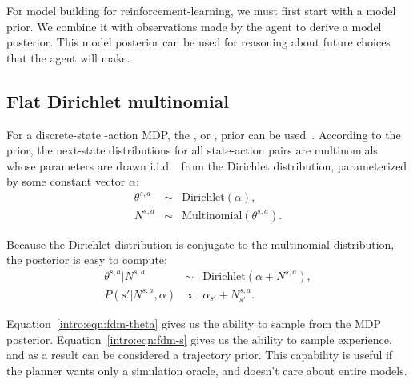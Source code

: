 For model building for reinforcement-learning, we must first start with a model prior. We combine it with observations made by the agent to derive a model posterior. This model posterior can be used for reasoning about future choices that the agent will make.

\subsection{Flat Dirichlet multinomial}

\label{intro:fdm}

For a discrete-state -action MDP, the , or , prior can be used~\cite{poupart06}. According to the  prior, the next-state distributions for all state-action pairs are multinomials whose parameters are drawn i.i.d. \ from the Dirichlet distribution, parameterized by some constant vector $\alpha$:
\begin{eqnarray}
\theta^{s,a} &\sim& \mbox{Dirichlet}(\alpha),\\
N^{s,a} &\sim& \mbox{Multinomial}(\theta^{s,a}).
\end{eqnarray}

Because the Dirichlet distribution is conjugate to the multinomial distribution, the  posterior is easy to compute:
\begin{eqnarray}
\label{intro:eqn:fdm-theta}\theta^{s,a}|N^{s,a} &\sim& \mbox{Dirichlet}(\alpha+N^{s,a}),\\
\label{intro:eqn:fdm-s}P(s'|N^{s,a},\alpha) &\propto& \alpha_{s'}+N^{s,a}_{s'}.
\end{eqnarray}


Equation~\ref{intro:eqn:fdm-theta} gives us the ability to sample from the MDP posterior. Equation~\ref{intro:eqn:fdm-s} gives us the ability to sample experience, and as a result  can be considered a trajectory prior. This capability is useful if the planner wants only a simulation oracle, and doesn't care about entire models.

